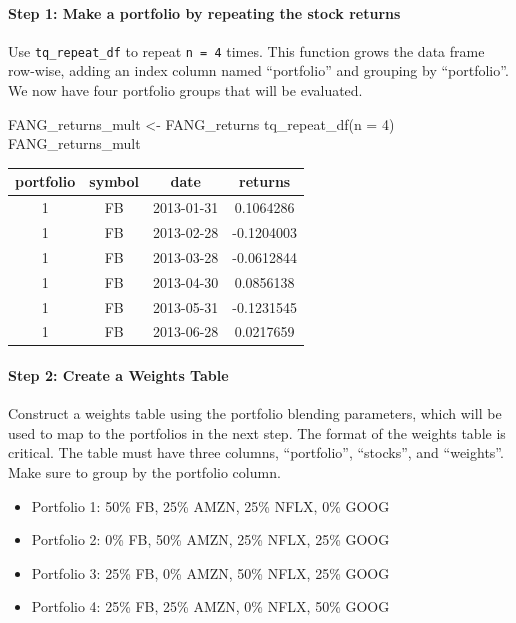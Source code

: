 \paragraph{Step 1: Make a portfolio by repeating the stock
returns}\label{step-1-make-a-portfolio-by-repeating-the-stock-returns}

Use \texttt{tq\_repeat\_df} to repeat \texttt{n\ =\ 4} times. This
function grows the data frame row-wise, adding an index column named
``portfolio'' and grouping by ``portfolio''. We now have four portfolio
groups that will be evaluated.

\begin{Schunk}
\begin{Sinput}
FANG_returns_mult <- FANG_returns %
    tq_repeat_df(n = 4)
FANG_returns_mult
\end{Sinput}
\end{Schunk}

\begin{tabular}{cccc}
\toprule
portfolio & symbol & date & returns\\
\midrule
1 & FB & 2013-01-31 & 0.1064286\\
1 & FB & 2013-02-28 & -0.1204003\\
1 & FB & 2013-03-28 & -0.0612844\\
1 & FB & 2013-04-30 & 0.0856138\\
1 & FB & 2013-05-31 & -0.1231545\\
1 & FB & 2013-06-28 & 0.0217659\\
\bottomrule
\end{tabular}

\hspace{20 mm}

\paragraph{Step 2: Create a Weights
Table}\label{step-2-create-a-weights-table}

Construct a weights table using the portfolio blending parameters, which
will be used to map to the portfolios in the next step. The format of
the weights table is critical. The table must have three columns,
``portfolio'', ``stocks'', and ``weights''. Make sure to group by the
portfolio column.

\begin{itemize}
\tightlist
\item
  Portfolio 1: 50\% FB, 25\% AMZN, 25\% NFLX, 0\% GOOG
\item
  Portfolio 2: 0\% FB, 50\% AMZN, 25\% NFLX, 25\% GOOG
\item
  Portfolio 3: 25\% FB, 0\% AMZN, 50\% NFLX, 25\% GOOG
\item
  Portfolio 4: 25\% FB, 25\% AMZN, 0\% NFLX, 50\% GOOG
\end{itemize}

